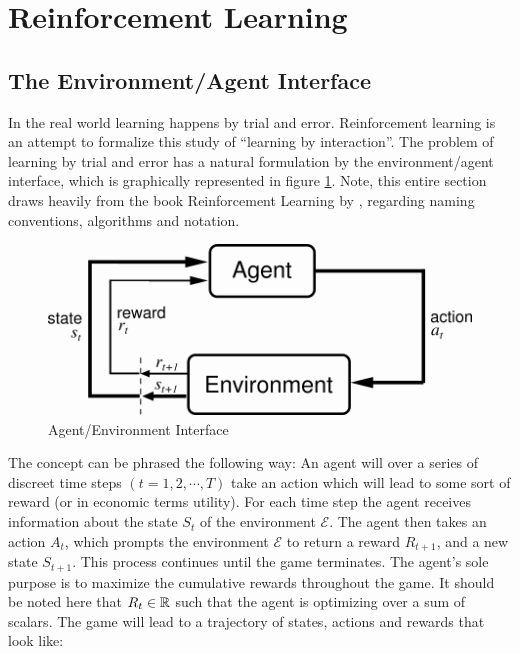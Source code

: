 \section{Reinforcement Learning}
\label{sec:rl_theory}

\subsection{The Environment/Agent Interface}

In the real world learning happens by trial and error. Reinforcement learning is an attempt to formalize this study of ``learning by interaction''. The problem of learning by trial and error has a natural formulation by the environment/agent interface, which is graphically represented in figure \ref{fig:agent_enviroment_interface}. Note, this entire section draws heavily from the book Reinforcement Learning by \textcite{sutton_reinforcement_2018}, regarding naming conventions, algorithms and notation.

\begin{figure}
    \centering
    \includegraphics[scale=0.35]{figures/agent_environment_interface.png}
    \caption{Agent/Environment Interface}
    \label{fig:agent_enviroment_interface}
\end{figure}

The concept can be phrased the following way: An agent will over a series of discreet time steps $(t=1, 2, \cdots, T)$ take an action which will lead to some sort of reward (or in economic terms utility). For each time step the agent receives information about the state $S_t$ of the environment $\mathcal{E}$. The agent then takes an action $A_t$, which prompts the environment $\mathcal{E}$  to return a reward $R_{t+1}$, and a new state $S_{t+1}$. This process continues until the game terminates. The agent's sole purpose is to maximize the cumulative rewards throughout the game. It should be noted here that $R_t \in \mathbb{R}$ such that the agent is optimizing over a sum of scalars. The game will lead to a trajectory of states, actions and rewards that look like:

